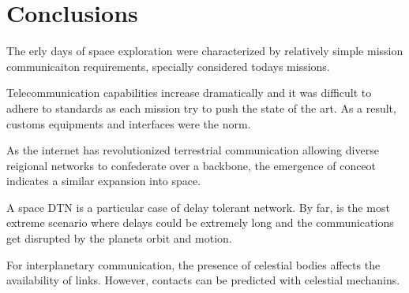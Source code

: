\section{Conclusions}
\label{sec:con}

The erly days of space exploration were characterized by relatively simple mission communicaiton requirements, specially considered todays missions. 

Telecommunication capabilities increase dramatically and it was difficult to adhere to standards as each mission try to push the state of the art. As a result, customs equipments and interfaces were the norm. 

As the internet has revolutionized terrestrial communication allowing diverse reigional networks to confederate over a backbone, the emergence of conceot indicates a similar expansion into space.  


A space DTN is a particular case of delay tolerant network. By far, is the most extreme scenario where delays could be extremely long and the communications get disrupted by the planets orbit and motion.

For interplanetary communication, the presence of celestial bodies affects the availability of links. However, contacts can be predicted with celestial mechanins.